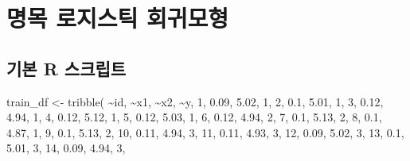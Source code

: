 \documentclass[
]{book}
\newenvironment{Shaded}{\begin{snugshade}}{\end{snugshade}}
\newcommand{\DecValTok}[1]{\textcolor[rgb]{0.00,0.00,0.81}{#1}}
\newcommand{\FloatTok}[1]{\textcolor[rgb]{0.00,0.00,0.81}{#1}}
\newcommand{\FunctionTok}[1]{\textcolor[rgb]{0.00,0.00,0.00}{#1}}
\newcommand{\NormalTok}[1]{#1}
\newcommand{\OtherTok}[1]{\textcolor[rgb]{0.56,0.35,0.01}{#1}}
\newcommand{\SpecialCharTok}[1]{\textcolor[rgb]{0.00,0.00,0.00}{#1}}
\begin{document}
\hypertarget{nominal-logistic-regression}{%
\section{명목 로지스틱 회귀모형}\label{nominal-logistic-regression}}

\hypertarget{nominal-logistic-reg-basic-script}{%
\subsection{기본 R 스크립트}\label{nominal-logistic-reg-basic-script}}

\begin{Shaded}
\begin{Highlighting}[]
\NormalTok{train\_df }\OtherTok{\textless{}{-}} \FunctionTok{tribble}\NormalTok{(}
  \SpecialCharTok{\textasciitilde{}}\NormalTok{id, }\SpecialCharTok{\textasciitilde{}}\NormalTok{x1, }\SpecialCharTok{\textasciitilde{}}\NormalTok{x2, }\SpecialCharTok{\textasciitilde{}}\NormalTok{y,}
  \DecValTok{1}\NormalTok{, }\FloatTok{0.09}\NormalTok{, }\FloatTok{5.02}\NormalTok{, }\DecValTok{1}\NormalTok{,}
  \DecValTok{2}\NormalTok{, }\FloatTok{0.1}\NormalTok{, }\FloatTok{5.01}\NormalTok{, }\DecValTok{1}\NormalTok{,}
  \DecValTok{3}\NormalTok{, }\FloatTok{0.12}\NormalTok{, }\FloatTok{4.94}\NormalTok{, }\DecValTok{1}\NormalTok{,}
  \DecValTok{4}\NormalTok{, }\FloatTok{0.12}\NormalTok{, }\FloatTok{5.12}\NormalTok{, }\DecValTok{1}\NormalTok{,}
  \DecValTok{5}\NormalTok{, }\FloatTok{0.12}\NormalTok{, }\FloatTok{5.03}\NormalTok{, }\DecValTok{1}\NormalTok{,}
  \DecValTok{6}\NormalTok{, }\FloatTok{0.12}\NormalTok{, }\FloatTok{4.94}\NormalTok{, }\DecValTok{2}\NormalTok{,}
  \DecValTok{7}\NormalTok{, }\FloatTok{0.1}\NormalTok{, }\FloatTok{5.13}\NormalTok{, }\DecValTok{2}\NormalTok{,}
  \DecValTok{8}\NormalTok{, }\FloatTok{0.1}\NormalTok{, }\FloatTok{4.87}\NormalTok{, }\DecValTok{1}\NormalTok{,}
  \DecValTok{9}\NormalTok{, }\FloatTok{0.1}\NormalTok{, }\FloatTok{5.13}\NormalTok{, }\DecValTok{2}\NormalTok{,}
  \DecValTok{10}\NormalTok{, }\FloatTok{0.11}\NormalTok{, }\FloatTok{4.94}\NormalTok{, }\DecValTok{3}\NormalTok{,}
  \DecValTok{11}\NormalTok{, }\FloatTok{0.11}\NormalTok{, }\FloatTok{4.93}\NormalTok{, }\DecValTok{3}\NormalTok{,}
  \DecValTok{12}\NormalTok{, }\FloatTok{0.09}\NormalTok{, }\FloatTok{5.02}\NormalTok{, }\DecValTok{3}\NormalTok{,}
  \DecValTok{13}\NormalTok{, }\FloatTok{0.1}\NormalTok{, }\FloatTok{5.01}\NormalTok{, }\DecValTok{3}\NormalTok{,}
  \DecValTok{14}\NormalTok{, }\FloatTok{0.09}\NormalTok{, }\FloatTok{4.94}\NormalTok{, }\DecValTok{3}\NormalTok{,}

\end{Highlighting}
\end{Shaded}
\end{document}
